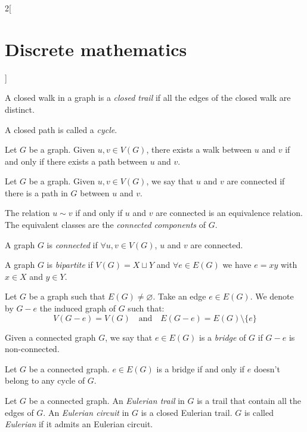 \documentclass[../../../main.tex]{subfiles}
\begin{document}
\begin{multicols}{2}[\section{Discrete mathematics}]
\begin{definition}
    A closed walk in a graph is a \emph{closed trail} if all the edges of the closed walk are distinct.
  \end{definition}
  \begin{definition}
    A closed path is called a \emph{cycle}.
  \end{definition}
  \begin{proposition}
    Let $G$ be a graph. Given $u,v\in V(G)$, there exists a walk between $u$ and $v$ if and only if there exists a path between $u$ and $v$.
  \end{proposition}
  \begin{definition}
    Let $G$ be a graph. Given $u,v\in V(G)$, we say that $u$ and $v$ are connected if there is a path in $G$ between $u$ and $v$.
  \end{definition}
  \begin{proposition}
    The relation $u\sim v$ if and only if $u$ and $v$ are connected is an equivalence relation. The equivalent classes are the \emph{connected components} of $G$.
  \end{proposition}
  \begin{definition}
    A graph $G$ is \emph{connected} if $\forall u,v\in V(G)$, $u$ and $v$ are connected.
  \end{definition}
  \begin{definition}
    A graph $G$ is \emph{bipartite} if $V(G)=X\sqcup Y$ and $\forall e\in E(G)$ we have $e=xy$ with $x\in X$ and $y\in Y$.
  \end{definition}
  \begin{definition}
    Let $G$ be a graph such that $E(G)\ne\varnothing$. Take an edge $e\in E(G)$. We denote by $G-e$ the induced graph of $G$ such that: $$V(G-e)=V(G)\quad\text{and}\quad E(G-e)=E(G)\setminus\{e\}$$
  \end{definition}
  \begin{definition}
    Given a connected graph $G$, we say that $e\in E(G)$ is a \emph{bridge} of $G$ if $G-e$ is non-connected.
  \end{definition}
  \begin{proposition}
    Let $G$ be a connected graph. $e\in E(G)$ is a bridge if and only if $e$ doesn't belong to any cycle of $G$.
  \end{proposition}
  \begin{definition}
    Let $G$ be a connected graph. An \emph{Eulerian trail} in $G$ is a trail that contain all the edges of $G$. An \emph{Eulerian circuit} in $G$ is a closed Eulerian trail. $G$ is called \emph{Eulerian} if it admits an Eulerian circuit.

\end{definition}
\end{multicols}
\end{document}
